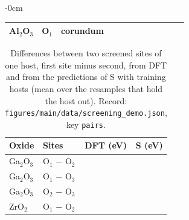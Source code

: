 \begin{table}[H]
\begin{adjustwidth}{-\extralength}{0cm}
\begin{tabular}{lllrrrrrrrrr}
Al$_2$O$_3$ & O$_1$ & corundum & \numScreeningDemoHostsAlTwoOThreeSpaceGroupNumber{} & \numScreeningDemoSitesAlTwoOThreeVaOOneZeroFirstShellCations{} & \numScreeningDemoSitesAlTwoOThreeVaOOneZeroFirstShellMeanDistanceA{} & \numScreeningDemoSitesAlTwoOThreeVaOOneZeroBandGapEV{} & \numScreeningDemoSitesAlTwoOThreeVaOOneZeroHostFormationEnergyEVPerAtom{} & \numNetScreenAlTwoOThreeOOneDft{} & \numNetScreenAlTwoOThreeOOnePred{} & \numNetScreenAlTwoOThreeOOneErr{} & \numNetScreenAlTwoOThreeOOneN{} \\
\bottomrule
\end{tabular}
\end{adjustwidth}
\end{table}

\begin{table}[H]
\caption{Differences between two screened sites of one host, first site minus second, from DFT and from the predictions of S with \numNetScreenBudget{} training hosts (mean over the resamples that hold the host out). Record: \texttt{figures/main/data/screening\_demo.json}, key \texttt{pairs}.\label{tab:app_pairs}}
\centering
\small
\begin{tabular}{llrr}
\toprule
Oxide & Sites & DFT (eV) & S (eV) \\
\midrule
Ga$_2$O$_3$ & O$_1$ $-$ O$_2$ & \numScreeningDemoPairsGaTwoOThreeOOneOTwoDftDiffEV{} & \numScreeningDemoPairsGaTwoOThreeOOneOTwoVTwoDiffEV{} \\
Ga$_2$O$_3$ & O$_1$ $-$ O$_3$ & \numScreeningDemoPairsGaTwoOThreeOOneOThreeDftDiffEV{} & \numScreeningDemoPairsGaTwoOThreeOOneOThreeVTwoDiffEV{} \\
Ga$_2$O$_3$ & O$_2$ $-$ O$_3$ & \numScreeningDemoPairsGaTwoOThreeOTwoOThreeDftDiffEV{} & \numScreeningDemoPairsGaTwoOThreeOTwoOThreeVTwoDiffEV{} \\
ZrO$_2$ & O$_1$ $-$ O$_2$ & \numScreeningDemoPairsZrOTwoOOneOTwoDftDiffEV{} & \numScreeningDemoPairsZrOTwoOOneOTwoVTwoDiffEV{} \\
\bottomrule
\end{tabular}
\end{table}

